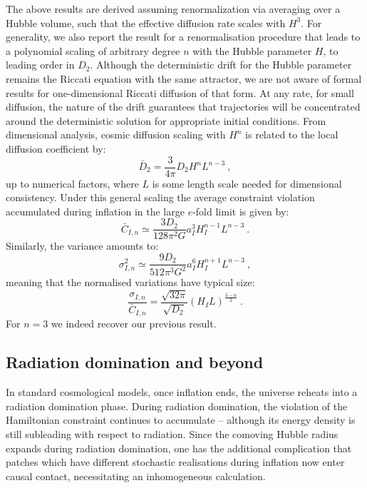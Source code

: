 \documentclass[amsmath,amssymb,11pt]{article}
\begin{document}
The above results are derived assuming renormalization via averaging over a Hubble volume, such that the effective diffusion rate scales with $H^3$. For generality, we also report the result for a renormalisation procedure that leads to a polynomial scaling of arbitrary degree $n$ with the Hubble parameter $H$, to leading order in $D_2$. Although the deterministic drift for the Hubble parameter remains the Riccati equation with the same attractor, we are not aware of formal results for one-dimensional Riccati diffusion of that form. At any rate, for small diffusion, the nature of the drift guarantees that trajectories will be concentrated around the deterministic solution for appropriate initial conditions. From dimensional analysis, cosmic diffusion scaling with $H^n$ is related to the local diffusion coefficient by:
\begin{equation}
  \bar{D}_2 = \frac{3}{4\pi}D_2 H^{n} L^{n-3} \ , 
\end{equation}
up to numerical factors, where $L$ is some length scale needed for dimensional consistency. Under this general scaling the average constraint violation accumulated during inflation in the large $e$-fold limit is given by:
\begin{equation}
    \bar{C}_{I,n} \simeq  \frac{3 D_2 }{128\pi^2 G} a_I^3 H_I^{n-1} L^{n-3}  \ .
\end{equation}
Similarly, the variance amounts to:
\begin{equation}
    \sigma_{I,n}^2 \simeq  \frac{9 D_2 }{512\pi^3 G^2} a_I^6 H_I^{n+1} L^{n-3} \ ,
\end{equation}
meaning that the normalised variations have typical size:
\begin{equation}
    \frac{\sigma_{I,n}}{\bar{C}_{I,n}} =  \frac{\sqrt{32\pi}}{\sqrt{ D_2}}\left(H_I L\right)^{\frac{3-n}{2}} \ .
\end{equation}
For $n=3$ we indeed recover our previous result.

\subsection{Radiation domination and beyond}
In standard cosmological models, once inflation ends, the universe reheats into a radiation domination phase. During radiation domination, the violation of the Hamiltonian constraint continues to accumulate -- although its energy density is still subleading with respect to radiation. Since the comoving Hubble radius expands during radiation domination, one has the additional complication that patches which have different stochastic realisations during inflation now enter causal contact, necessitating an inhomogeneous calculation. 
\end{document}
